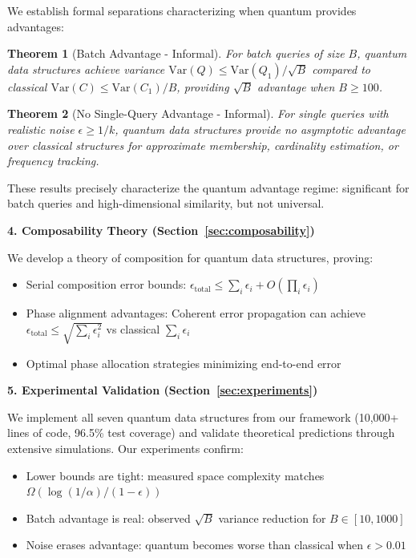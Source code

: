 \documentclass[11pt,letterpaper]{article}
\newtheorem{theorem}{Theorem}
\begin{document}
We establish formal separations characterizing when quantum provides advantages:

\begin{theorem}[Batch Advantage - Informal]
\label{thm:batch_advantage_informal}
For batch queries of size $B$, quantum data structures achieve variance $\text{Var}(Q) \leq \text{Var}(Q_1)/\sqrt{B}$ compared to classical $\text{Var}(C) \leq \text{Var}(C_1)/B$, providing $\sqrt{B}$ advantage when $B \geq 100$.
\end{theorem}

\begin{theorem}[No Single-Query Advantage - Informal]
\label{thm:no_single_advantage_informal}
For single queries with realistic noise $\epsilon \geq 1/k$, quantum data structures provide no asymptotic advantage over classical structures for approximate membership, cardinality estimation, or frequency tracking.
\end{theorem}

These results precisely characterize the quantum advantage regime: significant for batch queries and high-dimensional similarity, but not universal.

\textbf{4. Composability Theory (Section~\ref{sec:composability})}

We develop a theory of composition for quantum data structures, proving:
\begin{itemize}
\item Serial composition error bounds: $\epsilon_{\text{total}} \leq \sum_i \epsilon_i + O(\prod_i \epsilon_i)$
\item Phase alignment advantages: Coherent error propagation can achieve $\epsilon_{\text{total}} \leq \sqrt{\sum_i \epsilon_i^2}$ vs classical $\sum_i \epsilon_i$
\item Optimal phase allocation strategies minimizing end-to-end error
\end{itemize}

\textbf{5. Experimental Validation (Section~\ref{sec:experiments})}

We implement all seven quantum data structures from our framework (10,000+ lines of code, 96.5\% test coverage) and validate theoretical predictions through extensive simulations. Our experiments confirm:
\begin{itemize}
\item Lower bounds are tight: measured space complexity matches $\Omega(\log(1/\alpha)/(1-\epsilon))$
\item Batch advantage is real: observed $\sqrt{B}$ variance reduction for $B \in [10, 1000]$
\item Noise erases advantage: quantum becomes worse than classical when $\epsilon > 0.01$
\end{itemize}
\end{document}
